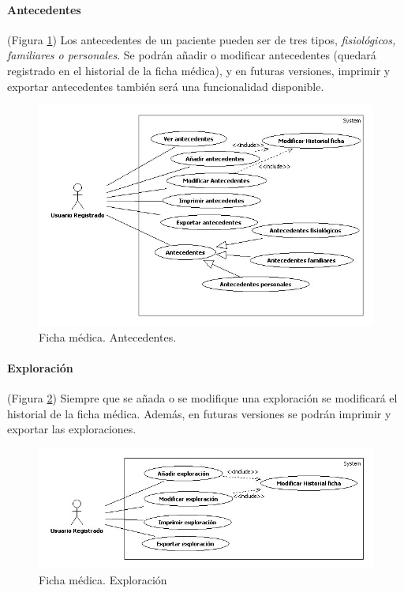				\paragraph{Antecedentes} %
				\label{par:antecedentes}
					(Figura \ref{fig:ant_fic}) Los antecedentes de un paciente pueden ser de tres tipos, \textit{fisiológicos, familiares o personales}. Se podrán añadir o modificar antecedentes (quedará registrado en el historial de la ficha médica), y en futuras versiones, imprimir y exportar antecedentes también será una funcionalidad disponible.
					\begin{figure}[H]
					  \centering
					    \includegraphics[width=14cm]{img/jpg/casos_uso/Antecedentes.jpg}
					  \caption{Ficha médica. Antecedentes.}
					  \label{fig:ant_fic}
					\end{figure}

				\paragraph{Exploración} %
				\label{par:exploracion}
					(Figura \ref{fig:exp_fic}) Siempre que se añada o se modifique una exploración se modificará el historial de la ficha médica. Además, en futuras versiones se podrán imprimir y exportar las exploraciones.
					\begin{figure}[H]
					  \centering
					    \includegraphics[width=14cm]{img/jpg/casos_uso/Exploracion.jpg}
					  \caption{Ficha médica. Exploración}
					  \label{fig:exp_fic}
					\end{figure}

